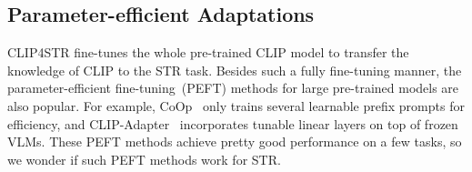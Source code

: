 \documentclass[lettersize,journal]{IEEEtran}
\begin{document}
\begin{table}[!t]
    \centering
    \caption{\textbf{Parameter-efficient adaptations}.
    \#Params means the learnable parameters in the visual encoder.
     is the feature reduction ratio in LST.
    Here we only show the results of the visual branch in CLIP4STR-B,
    and the cross-modal branch is ignored.
    }
    \setlength\tabcolsep{3pt}
  \label{tab:adapter}
\end{table} 
\subsection{Parameter-efficient Adaptations}
CLIP4STR fine-tunes the whole pre-trained CLIP model to transfer the knowledge of CLIP to the STR task.
Besides such a fully fine-tuning manner, the parameter-efficient fine-tuning~(PEFT) methods for large pre-trained models are also popular.
For example, CoOp~\cite{zhou2021coop} only trains several learnable prefix prompts for efficiency, and CLIP-Adapter~\cite{2021_gao_clip_adapter} incorporates tunable linear layers on top of frozen VLMs.
These PEFT methods achieve pretty good performance on a few tasks, so we wonder if such PEFT methods work for STR.
\end{document}
